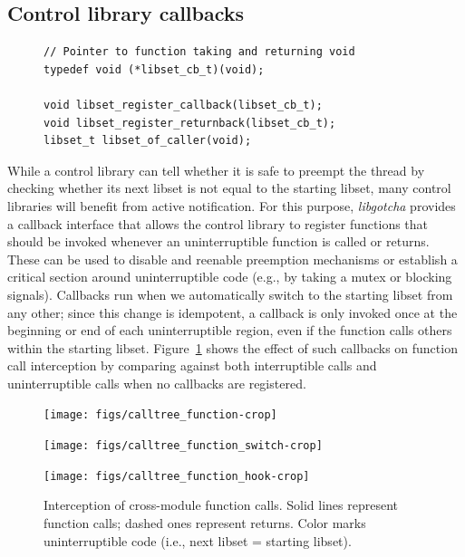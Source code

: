 \subsection{Control library callbacks}
\label{sec:libgotcha:callbacks}

\begin{figure}
\begin{lstlisting}[label=lst:gotchacbapi,caption=\textit{libgotcha} C callback interface]
// Pointer to function taking and returning void
typedef void (*libset_cb_t)(void);

void libset_register_callback(libset_cb_t);
void libset_register_returnback(libset_cb_t);
libset_t libset_of_caller(void);
\end{lstlisting}
\end{figure}

While a control library can tell whether it is safe to preempt the thread by checking
whether its next libset is not equal to the starting libset, many control libraries
will benefit from active notification.  For this purpose, \textit{libgotcha} provides
a callback interface that allows the control library to register functions that
should be invoked whenever an uninterruptible function is called or returns.  These
can be used to disable and reenable preemption mechanisms or establish a critical
section around uninterruptible code (e.g., by taking a mutex or blocking signals).
Callbacks run when we automatically switch to the starting libset from any other;
since this change is idempotent, a callback is only invoked once at the beginning or
end of each uninterruptible region, even if the function calls others within the
starting libset.  Figure~\ref{fig:gotchahooks} shows the effect of such callbacks on
function call interception by comparing against both interruptible calls and
uninterruptible calls when no callbacks are registered.

\begin{figure}
	\begin{minipage}{\textwidth}
	\texttt{[image: figs/calltree\_function-crop]}
	\end{minipage}

	\begin{minipage}{\textwidth}
	\texttt{[image: figs/calltree\_function\_switch-crop]}
	\end{minipage}

	\begin{minipage}{\textwidth}
	\texttt{[image: figs/calltree\_function\_hook-crop]}
	\end{minipage}
\caption[Interception of cross-module function calls]{
Interception of cross-module function calls. Solid lines represent function calls;
dashed ones represent returns. Color marks uninterruptible code (i.e., next libset =
starting libset).}
\label{fig:gotchahooks}
\end{figure}

